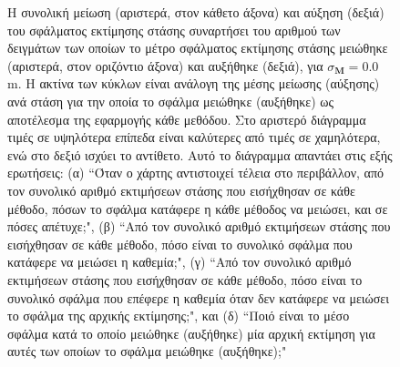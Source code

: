 \begin{figure}[!h]\vspace{3cm}%
  
  \vspace{1cm}
  \caption{\small Η συνολική μείωση (αριστερά, στον κάθετο άξονα) και αύξηση
           (δεξιά) του σφάλματος εκτίμησης στάσης συναρτήσει του αριθμού των
           δειγμάτων των οποίων το μέτρο σφάλματος εκτίμησης στάσης μειώθηκε
           (αριστερά, στον οριζόντιο άξονα) και αυξήθηκε (δεξιά), για
           $\sigma_{\bm{M}} = 0.0$ m. Η ακτίνα των κύκλων είναι ανάλογη της
           μέσης μείωσης (αύξησης) ανά στάση για την οποία το σφάλμα μειώθηκε
           (αυξήθηκε) ως αποτέλεσμα της εφαρμογής κάθε μεθόδου. Στο αριστερό
           διάγραμμα τιμές σε υψηλότερα επίπεδα είναι καλύτερες από τιμές σε
           χαμηλότερα, ενώ στο δεξιό ισχύει το αντίθετο. Αυτό το
           διάγραμμα απαντάει στις εξής ερωτήσεις: (α) ``Όταν ο χάρτης
           αντιστοιχεί τέλεια στο περιβάλλον, από τον συνολικό αριθμό
           εκτιμήσεων στάσης που εισήχθησαν σε κάθε μέθοδο, πόσων το σφάλμα
           κατάφερε η κάθε μέθοδος να μειώσει, και σε πόσες απέτυχε;", (β)
           ``Από τον συνολικό αριθμό εκτιμήσεων στάσης που εισήχθησαν σε κάθε
           μέθοδο, πόσο είναι το συνολικό σφάλμα που κατάφερε να μειώσει η
           καθεμία;", (γ) ``Από τον συνολικό αριθμό εκτιμήσεων στάσης που
           εισήχθησαν σε κάθε μέθοδο, πόσο είναι το συνολικό σφάλμα που επέφερε
           η καθεμία όταν δεν κατάφερε να μειώσει το σφάλμα της αρχικής
           εκτίμησης;", και (δ) ``Ποιό είναι το μέσο σφάλμα κατά το οποίο
           μειώθηκε (αυξήθηκε) μία αρχική εκτίμηση για αυτές των οποίων το
           σφάλμα μειώθηκε (αυξήθηκε);"}
  \label{fig:02_04_05:01_circles_sm0}
\end{figure}

